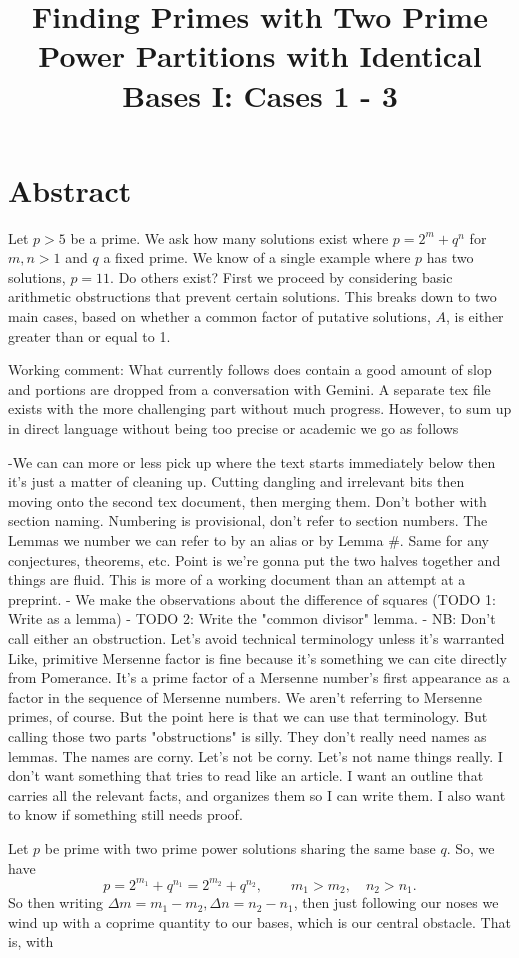 \documentclass{article}
\title{Finding Primes with Two Prime Power Partitions with Identical Bases I: Cases 1 - 3}
\begin{document}
\section*{Abstract}

Let $p \gt 5$ be a prime. We ask how many solutions exist where $p = 2^m + q^n$ for $m, n \gt 1$ and $q$ a fixed prime.
We know of a single example where $p$ has two solutions, $p =  11$. Do others exist? First we proceed by
considering basic arithmetic obstructions that prevent certain solutions. This breaks down to two main cases,
based on whether a common factor of putative solutions, $A$, is either greater than or equal to 1.

Working comment: What currently follows does contain a good amount of slop and portions are dropped from
a conversation with Gemini. A separate tex file exists with the more challenging part without
much progress. However, to sum up in direct language without being too precise or academic we go as follows


  -We can can more or less pick up where the text
  starts immediately below then it's just a matter of cleaning up. Cutting dangling and irrelevant bits
  then moving onto the second tex document, then merging them. Don't bother with section naming.
  Numbering is provisional, don't refer to section numbers. The Lemmas we number we can refer to by
  an alias or by Lemma #. Same for any conjectures, theorems, etc.
  Point is we're gonna put the two halves together and things are fluid. This is more of a working
  document than an attempt at a preprint.
- We make the observations about the difference of squares (TODO 1: Write as a lemma)
- TODO 2: Write the "common divisor" lemma.
- NB: Don't call either an obstruction. Let's avoid technical terminology unless it's warranted
  Like, primitive Mersenne factor is fine because it's something we can cite directly from Pomerance.
  It's a prime factor of a Mersenne number's first appearance as a factor in the sequence of Mersenne
  numbers. We aren't referring to Mersenne primes, of course.  But the point here is that we can use
  that terminology. But calling those two parts "obstructions" is silly.
  They don't really need names as lemmas. The names are corny. Let's not be corny. Let's not name
  things really. I don't want something that tries to read like an article. I want an outline
  that carries all the relevant facts, and organizes them so I can write them. I also want to know
  if something still needs proof.

Let $p$ be prime with two prime power solutions sharing the same base $q$. So, we have
\[
p = 2^{m_1} + q^{n_1} = 2^{m_2} + q^{n_2}, \qquad m_1 > m_2, \quad n_2 > n_1.
\]
So then writing $\Delta m = m_1 - m_2, \Delta n = n_2 - n_1$, then just following our noses we
wind up with a coprime quantity to our bases, which is our central obstacle. That is, with
\end{document}
